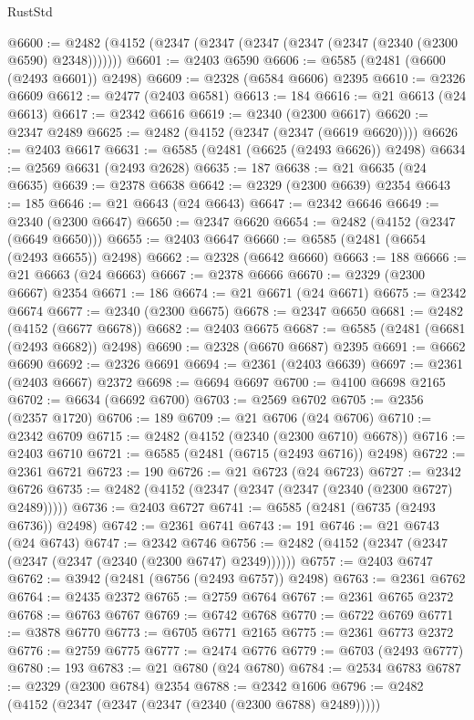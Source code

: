 \begin{lexlean}{RustStd}
\begin{coremodule}
{\begin{coremodule}
{{{{{{{{{{{{{{{{{{{{{{{{{{{{{{{{{{{{{@6600 := @2482 (@4152 (@2347 (@2347 (@2347 (@2347 (@2347 (@2340 (@2300 @6590) @2348)))))))
@6601 := @2403 @6590
@6606 := @6585 (@2481 (@6600 (@2493 @6601)) @2498)
@6609 := @2328 (@6584 @6606) @2395
@6610 := @2326 @6609
@6612 := @2477 (@2403 @6581)
@6613 := 184
@6616 := @21 @6613 (@24 @6613)
@6617 := @2342 @6616
@6619 := @2340 (@2300 @6617)
@6620 := @2347 @2489
@6625 := @2482 (@4152 (@2347 (@2347 (@6619 @6620))))
@6626 := @2403 @6617
@6631 := @6585 (@2481 (@6625 (@2493 @6626)) @2498)
@6634 := @2569 @6631 (@2493 @2628)
@6635 := 187
@6638 := @21 @6635 (@24 @6635)
@6639 := @2378 @6638
@6642 := @2329 (@2300 @6639) @2354
@6643 := 185
@6646 := @21 @6643 (@24 @6643)
@6647 := @2342 @6646
@6649 := @2340 (@2300 @6647)
@6650 := @2347 @6620
@6654 := @2482 (@4152 (@2347 (@6649 @6650)))
@6655 := @2403 @6647
@6660 := @6585 (@2481 (@6654 (@2493 @6655)) @2498)
@6662 := @2328 (@6642 @6660)
@6663 := 188
@6666 := @21 @6663 (@24 @6663)
@6667 := @2378 @6666
@6670 := @2329 (@2300 @6667) @2354
@6671 := 186
@6674 := @21 @6671 (@24 @6671)
@6675 := @2342 @6674
@6677 := @2340 (@2300 @6675)
@6678 := @2347 @6650
@6681 := @2482 (@4152 (@6677 @6678))
@6682 := @2403 @6675
@6687 := @6585 (@2481 (@6681 (@2493 @6682)) @2498)
@6690 := @2328 (@6670 @6687) @2395
@6691 := @6662 @6690
@6692 := @2326 @6691
@6694 := @2361 (@2403 @6639)
@6697 := @2361 (@2403 @6667) @2372
@6698 := @6694 @6697
@6700 := @4100 @6698 @2165
@6702 := @6634 (@6692 @6700)
@6703 := @2569 @6702
@6705 := @2356 (@2357 @1720)
@6706 := 189
@6709 := @21 @6706 (@24 @6706)
@6710 := @2342 @6709
@6715 := @2482 (@4152 (@2340 (@2300 @6710) @6678))
@6716 := @2403 @6710
@6721 := @6585 (@2481 (@6715 (@2493 @6716)) @2498)
@6722 := @2361 @6721
@6723 := 190
@6726 := @21 @6723 (@24 @6723)
@6727 := @2342 @6726
@6735 := @2482 (@4152 (@2347 (@2347 (@2347 (@2340 (@2300 @6727) @2489)))))
@6736 := @2403 @6727
@6741 := @6585 (@2481 (@6735 (@2493 @6736)) @2498)
@6742 := @2361 @6741
@6743 := 191
@6746 := @21 @6743 (@24 @6743)
@6747 := @2342 @6746
@6756 := @2482 (@4152 (@2347 (@2347 (@2347 (@2347 (@2340 (@2300 @6747) @2349))))))
@6757 := @2403 @6747
@6762 := @3942 (@2481 (@6756 (@2493 @6757)) @2498)
@6763 := @2361 @6762
@6764 := @2435 @2372
@6765 := @2759 @6764
@6767 := @2361 @6765 @2372
@6768 := @6763 @6767
@6769 := @6742 @6768
@6770 := @6722 @6769
@6771 := @3878 @6770
@6773 := @6705 @6771 @2165
@6775 := @2361 @6773 @2372
@6776 := @2759 @6775
@6777 := @2474 @6776
@6779 := @6703 (@2493 @6777)
@6780 := 193
@6783 := @21 @6780 (@24 @6780)
@6784 := @2534 @6783
@6787 := @2329 (@2300 @6784) @2354
@6788 := @2342 @1606
@6796 := @2482 (@4152 (@2347 (@2347 (@2347 (@2340 (@2300 @6788) @2489)))))
}}}}}}}}}}}}}}}}}}}}}}}}}}}}}}}}}}}}}
\end{coremodule}}
\end{coremodule}
\end{lexlean}
